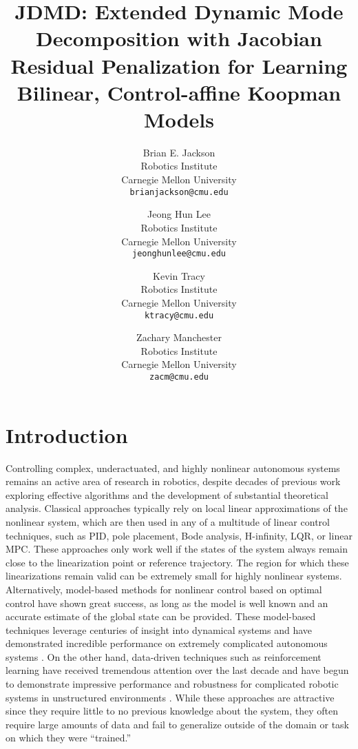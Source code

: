 \documentclass{article}
\title{JDMD: Extended Dynamic Mode Decomposition with Jacobian Residual Penalization
for Learning Bilinear, Control-affine Koopman Models}
\author{
  Brian E. Jackson \\
  Robotics Institute \\
  Carnegie Mellon University\\
  \texttt{brianjackson@cmu.edu} \\
  \and
  Jeong Hun Lee \\
  Robotics Institute\\
  Carnegie Mellon University\\
  \texttt{jeonghunlee@cmu.edu} \\
  \and
  Kevin Tracy \\
  Robotics Institute\\
  Carnegie Mellon University\\
  \texttt{ktracy@cmu.edu} \\
  \and
  Zachary Manchester \\
  Robotics Institute\\
  Carnegie Mellon University\\
  \texttt{zacm@cmu.edu} \\
}
\begin{document}
\maketitle


\section{Introduction}

    Controlling complex, underactuated, and highly nonlinear autonomous systems remains an
    active area of research in robotics, despite decades of previous work exploring
    effective algorithms and the development of substantial theoretical analysis. Classical
    approaches typically rely on local linear approximations of the nonlinear system, which
    are then used in any of a multitude of linear control techniques, such as PID, pole
    placement, Bode analysis, H-infinity, LQR, or linear MPC.  These approaches only work
    well if the states of the system always remain close to the linearization point or
    reference trajectory. The region for which these linearizations remain valid can be
    extremely small for highly nonlinear systems.  Alternatively, model-based methods for
    nonlinear control based on optimal control have shown great success, as long as the
    model is well known and an accurate estimate of the global state can be provided. These
    model-based techniques leverage centuries of insight into dynamical systems and have
    demonstrated incredible performance on extremely complicated autonomous systems 
    \cite{farshidian_efficient_2017,Kuindersma2014,Bjelonic2021,Subosits2019} .  On the
    other hand, data-driven techniques such as reinforcement learning have received
    tremendous attention over the last decade and have begun to demonstrate impressive
    performance and robustness for complicated robotic systems in unstructured environments
    \cite{Karnchanachari2020,Hoeller2020,Li2021}. While these approaches are attractive
    since they require little to no previous knowledge about the system, they often require
    large amounts of data and fail to generalize outside of the domain or task on which they
    were ``trained.''
    
\end{document}
